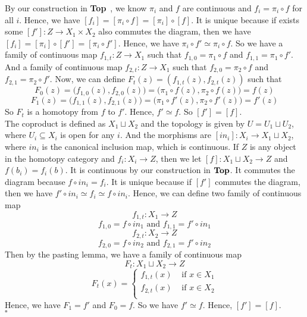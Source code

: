 \documentclass[12pt]{amsart}
\newcommand{\catname}[1]{{\normalfont\textbf{#1}}}
\newcommand{\Top}{\catname{Top}}
\begin{document}
By our construction in \Top \ , we know $\pi_i$ and $f$ are continuous and $f_i=\pi_i\circ f$ for all $i$. Hence, we have 
$[f_i]=[\pi_i\circ f]=[\pi_i]\circ [f]$. It is unique because if exists some $[f']:Z\to X_1\times X_2$ also commutes the diagram, then we have $[f_i]=[\pi_i]\circ [f']=[\pi_i\circ f']$. Hence, we have $\pi_i\circ f'\simeq \pi_i\circ f$. 
So we have a family of continuous map $f_{1,t}: Z\to X_1$ such that $f_{1,0}=\pi_1\circ f$ and $f_{1,1}=\pi_1\circ f'$. And a family of continuous map $f_{2,t}:Z\to X_1$ such that $f_{2,0}=\pi_2\circ f$ and $f_{2,1}=\pi_2\circ f'$.
Now, we can define $F_t(z)=(f_{1,t}(z),f_{2,t}(z))$ such that 
\[F_0(z)=\big(f_{1,0}(z),f_{2,0}(z)\big)=\big(\pi_1\circ f(z),\pi_2\circ f(z)\big)=f(z)\]
\[F_1(z)=\big(f_{1,1}(z),f_{2,1}(z)\big)=\big(\pi_1\circ f'(z),\pi_2\circ f'(z)\big)=f'(z)\]
So $F_t$ is a homotopy from $f$ to $f'$. Hence, $f'\simeq f$. So $[f']=[f]$.\\
The coproduct is defined as $X_1\sqcup X_2$ and the topology is given by  $U= U_1\sqcup U_2$, where $U_i\subseteq X_i$ is open for any $i$. And the morphisms are $[in_i]:X_i\to X_1\sqcup X_2$, where $in_i$ is the canonical inclusion map, which is continuous. If $Z$ is any object in the homotopy category and $f_i:X_i\to Z$, then we let $[f]:X_1\sqcup X_2\to Z$ and $f(b_i)=f_i(b)$. It is continuous by our construction in $\Top$. It commutes the diagram because $f\circ in_i=f_i$. It is unique because if $[f']$ commutes the diagram, then we have $f'\circ in_i\simeq f_i\simeq f\circ in_i$. Hence, we can define two family of continuous map 
\[f_{1,t}:X_1\to Z\]
\[f_{1,0}= f\circ in_1 \text{ and } f_{1,1}=f'\circ in_1\] 
\[f_{2,t}:X_2\to Z\] 
\[f_{2,0}= f\circ in_2 \text{ and } f_{2,1}=f'\circ in_2\]
Then by the pasting lemma, we have a family of continuous map
\[F_t:X_1\sqcup X_2\to Z\]
\[F_t(x)=\begin{cases}
    f_{1,t}(x) &\text{ if }x\in X_1\\
    f_{2,t}(x) &\text{ if }x\in X_2\\
\end{cases}\]
Hence, we have $F_1=f'$ and $F_0=f$. So we have $f'\simeq f$. Hence, $[f']=[f]$.
\\\phantom{qed}\hfill$\square$\\
\end{document}
